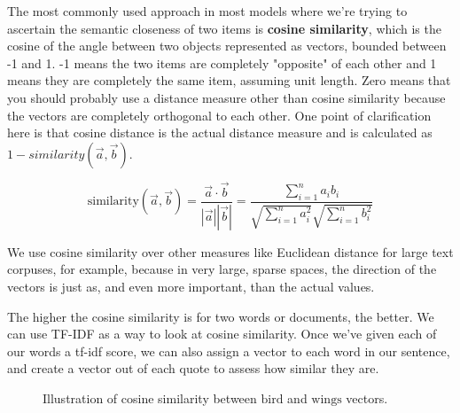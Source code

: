 \documentclass[11pt, table]{diazessay} %
\begin{document}
\begin{sloppypar}
The most commonly used approach in most models where we're trying to ascertain the semantic closeness of two items is \textbf{cosine similarity}, which is the cosine of the angle between two objects represented as vectors, bounded between -1 and 1. -1 means the two items are completely "opposite" of each other and 1 means they are completely the same item, assuming unit length. Zero means that you should probably use a distance measure other than cosine similarity because the vectors are completely orthogonal to each other. One point of clarification here is that cosine distance is the actual distance measure and is calculated as $1 - {similarity}(\vec{a}, \vec{b})$.

\begin{equation}
\mathrm{similarity}(\vec{a}, \vec{b}) = \frac{\vec{a} \cdot \vec{b}}{|\vec{a}| |\vec{b}|} = \frac{\sum\limits_{i=1}^{n} a_i b_i}{\sqrt{\sum\limits_{i=1}^{n} a_i^2} \sqrt{\sum\limits_{i=1}^{n} b_i^2}}
\end{equation}

We use cosine similarity over other measures like Euclidean distance for large text corpuses, for example, because in very large, sparse spaces, the direction of the vectors is just as, and even more important, than the actual values.

The higher the cosine similarity is for two words or documents, the better. We can use TF-IDF as a  way to look at cosine similarity. Once we've given each of our words a tf-idf score, we can also assign a vector to each word in our sentence, and create a vector out of each quote to assess how similar they are.


\begin{figure}[h]
    \centering
    \caption{Illustration of cosine similarity between $\text{bird}$ and $\text{wings}$ vectors.}
    \label{fig:cosine-similarity}
\end{figure}


\end{sloppypar}
\end{document}
